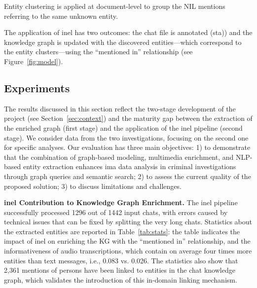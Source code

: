 %
Entity clustering is applied at document-level to group the NIL mentions referring to the same unknown entity. %


The application of \ac{inel} has two outcomes: the chat file is annotated (\acl{sta}))
and the knowledge graph is updated with the discovered entities---which correspond to the entity clusters---using the ``mentioned in'' relationship (see Figure~\ref{fig:model}).


\subsection{Experiments}
\label{sec:wise_experiments}

The results discussed in this section reflect the two-stage development of the project (see Section~\ref{sec:context}) and the maturity gap between the extraction of the enriched graph (first stage) and the application of the \ac{inel} pipeline (second stage). We consider data from the two investigations, focusing on the second one for specific analyses.  
Our evaluation has three main objectives: 1) to demonstrate that the combination of graph-based modeling, multimedia enrichment, and NLP-based entity extraction enhances \ac{ima} data analysis in criminal investigations through graph queries and semantic search; 2) to assess the current quality of the proposed solution; 3) to discuss limitations and challenges.
      



\textbf{\ac{inel} Contribution to Knowledge Graph Enrichment.} The \ac{inel} pipeline successfully processed 1296 out of 1442 input chats, with errors caused by technical issues that can be fixed by splitting the very long chats. Statistics about the extracted entities are reported in Table~\ref{tab:stats}: the table indicates the impact of \ac{inel} on enriching the KG with the ``mentioned in'' relationship, 
and the informativeness of audio transcriptions, which contain on average four times more entities than text messages, i.e., 0.083 vs. 0.026.
The statistics also show that 2,361 mentions of persons have been linked to entities in the chat knowledge graph, which validates the introduction of this in-domain linking mechanism.


